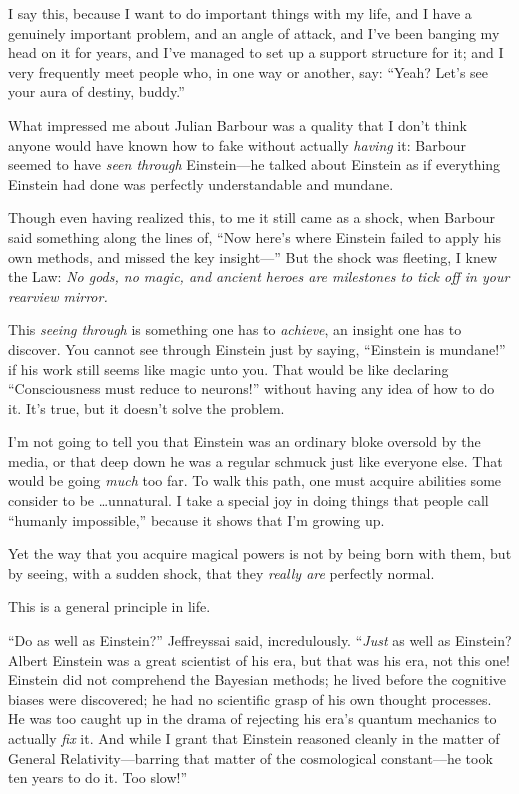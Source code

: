 {
 I say this, because I want to do important things with my life,
and I have a genuinely important problem, and an angle of attack, and
I've been banging my head on it for years, and
I've managed to set up a support structure for it; and
I very frequently meet people who, in one way or another, say:
``Yeah? Let's see your aura of
destiny, buddy.''}

{
 What impressed me about Julian Barbour was a quality that I
don't think anyone would have known how to fake without
actually \textit{having} it: Barbour seemed to have \textit{seen
through} Einstein---he talked about Einstein as if everything Einstein
had done was perfectly understandable and mundane.}

{
 Though even having realized this, to me it still came as a shock,
when Barbour said something along the lines of, ``Now
here's where Einstein failed to apply his own methods,
and missed the key insight---'' But the shock was
fleeting, I knew the Law: \textit{No gods, no magic, and ancient heroes
are milestones to tick off in your rearview mirror.}}

{
 This \textit{seeing through} is something one has to
\textit{achieve}, an insight one has to discover. You cannot see
through Einstein just by saying, ``Einstein is
mundane!'' if his work still seems like magic unto
you. That would be like declaring ``Consciousness must
reduce to neurons!'' without having any idea of how
to do it. It's true, but it doesn't
solve the problem.}

{
 I'm not going to tell you that Einstein was an
ordinary bloke oversold by the media, or that deep down he was a
regular schmuck just like everyone else. That would be going
\textit{much} too far. To walk this path, one must acquire abilities
some consider to be \ldots unnatural. I take a special joy in doing
things that people call ``humanly
impossible,'' because it shows that
I'm growing up.}

{
 Yet the way that you acquire magical powers is not by being born
with them, but by seeing, with a sudden shock, that they \textit{really
are} perfectly normal.}

{
 This is a general principle in life.}

\myendsectiontext


\bigskip


{
 ``Do as well as Einstein?''
Jeffreyssai said, incredulously. ``\textit{Just} as
well as Einstein? Albert Einstein was a great scientist of his era, but
that was his era, not this one! Einstein did not comprehend the
Bayesian methods; he lived before the cognitive biases were discovered;
he had no scientific grasp of his own thought processes. He was too
caught up in the drama of rejecting his era's quantum
mechanics to actually \textit{fix} it. And while I grant that Einstein
reasoned cleanly in the matter of General Relativity---barring that
matter of the cosmological constant---he took ten years to do it. Too
slow!'' }

